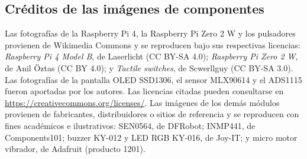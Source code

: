 \documentclass[10pt,a4paper]{article}
\begin{document}
\subsection*{Créditos de las imágenes de componentes}
Las fotografías de la Raspberry Pi 4, la Raspberry Pi Zero 2 W y los pulsadores provienen de Wikimedia Commons y se reproducen bajo sus respectivas licencias: \emph{Raspberry Pi 4 Model B}, de Laserlicht (CC BY-SA 4.0); \emph{Raspberry Pi Zero 2 W}, de Anil Öztas (CC BY 4.0); y \emph{Tactile switches}, de Scwerllguy (CC BY-SA 3.0). Las fotografías de la pantalla OLED SSD1306, el sensor MLX90614 y el ADS1115 fueron aportadas por los autores. Las licencias citadas pueden consultarse en \url{https://creativecommons.org/licenses/}. Las imágenes de los demás módulos provienen de fabricantes, distribuidores o sitios de referencia y se reproducen con fines académicos e ilustrativos: SEN0564, de DFRobot; INMP441, de Components101; buzzer KY-012 y LED RGB KY-016, de Joy-IT; y micro motor vibrador, de Adafruit (producto 1201).
\end{document}
